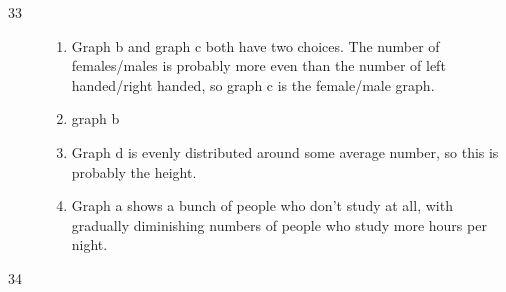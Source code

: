 \documentclass{exam}
\begin{document}
\begin{description}
      \item[33]
        \begin{enumerate}
          \item Graph b and graph c both have two choices.  The number of
            females/males is probably more even than the number of left
            handed/right handed, so graph c is the female/male graph.

          \item graph b

          \item Graph d is evenly distributed around some average number, so
            this is probably the height.

          \item Graph a shows a bunch of people who don't study at all, with
            gradually diminishing numbers of people who study more hours per
            night.
        \end{enumerate}

      \item[34]
\end{description}
\end{document}
